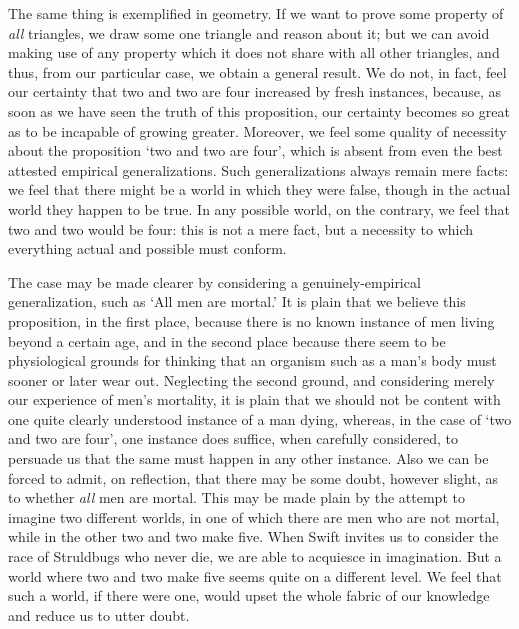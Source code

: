 \documentclass[oneside,letterpaper,12pt]{book}
\begin{document}
The same thing is exemplified in geometry. If we want to prove some
property of \emph{all} triangles, we draw some one triangle and reason
about it; but we can avoid making use of any property which it does not
share with all other triangles, and thus, from our particular case, we
obtain a general result. We do not, in fact, feel our certainty that two
and two are four increased by fresh instances, because, as soon as we
have seen the truth of this proposition, our certainty becomes so great
as to be incapable of growing greater. Moreover, we feel some quality of
necessity about the proposition `two and two are
four', which is absent from even the best attested
empirical generalizations. Such generalizations always remain mere
facts: we feel that there might be a world in which they were false,
though in the actual world they happen to be true. In any possible
world, on the contrary, we feel that two and two would be four: this is
not a mere fact, but a necessity to which everything actual and possible
must conform.

\label{empirical} The case may be made clearer by considering a genuinely-empirical
generalization, such as `All men are
mortal.' It is plain that we believe this proposition,
in the first place, because there is no known instance of men living
beyond a certain age, and in the second place because there seem to be
physiological grounds for thinking that an organism such as a
man's body must sooner or later wear out. Neglecting the
second ground, and considering merely our experience of
men's mortality, it is plain that we should not be
content with one quite clearly understood instance of a man dying,
whereas, in the case of `two and two are
four', one instance does suffice, when carefully
considered, to persuade us that the same must happen in any other
instance. Also we can be forced to admit, on reflection, that there may
be some doubt, however slight, as to whether \emph{all} men are mortal.
This may be made plain by the attempt to imagine two different worlds,
in one of which there are men who are not mortal, while in the other two
and two make five. When Swift invites us to consider the race of
Struldbugs who never die, we are able to acquiesce in imagination. But a
world where two and two make five seems quite on a different level. We
feel that such a world, if there were one, would upset the whole fabric
of our knowledge and reduce us to utter doubt.
\end{document}
